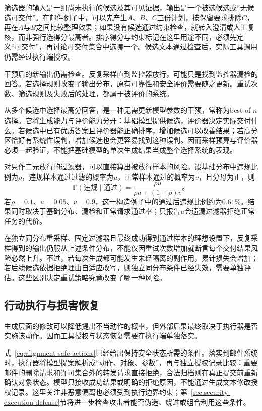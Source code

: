 筛选器的输入是一组尚未执行的候选及其可见证据，输出是一个被选候选或“无候选可交付”。在邮件例子中，可以先产生$A$、$B$、$C$三份计划，按保留要求排除$C$，再在$A$与$B$之间比较整理效果；如果没有候选通过约束检查，就转入澄清或人工复核，而非强行选得分最高者。排序得分与约束标记在这里用途不同，必须先定义“可交付”，再讨论可交付集合中选哪一个。候选文本通过检查后，实际工具调用仍需经过执行端授权。

干预后的新输出仍需检查。反复采样直到监控器放行，可能只是找到监控器漏检的回答。若选择规则改变了输出分布，原有可靠性和安全评价需要随之更新。重试次数、筛选规则及失败后的处理，都属于被评价的系统。

从多个候选中选择最高分回答，是一种无需更新模型参数的干预，常称为best-of-$n$选择。它将生成能力与评价能力分开：基础模型提供候选，评价器决定实际交付什么。若候选中已有优质答案且评价器能正确排序，增加候选可以改善结果；若高分区恰好有系统性误判，增加候选也会更容易找到这种误判。因而采样预算与评价器必须一起验证，不能把基础模型的单次生成结果当成整个选择系统的表现。

对只作二元放行的过滤器，可以直接算出被放行样本的风险。设基础分布中违规比例为$\rho$，违规样本通过过滤的概率为$u$，正常样本通过的概率为$v$，且分母为正，则
\begin{equation}
 \mathbb P(\text{违规}\mid\text{通过})
 =\frac{\rho u}{\rho u+(1-\rho)v}\text{。}
 \label{eq:alignment-filter-risk}
\end{equation}
若$\rho=0.1$、$u=0.05$、$v=0.9$，这一构造例子中的通过后违规比例约为$0.61\%$。结果同时取决于基础分布、漏检和正常请求通过率；只报告$u$会遗漏过滤器拒绝正常任务的代价。

在独立同分布重采样、固定过滤器且最终成功得到通过样本的理想设置下，反复采样得到的输出仍服从上述条件分布，不能仅因重试次数增加就断言每个交付结果风险必然上升。不过，若每次生成都可能发生未经隔离的副作用，累计损失会增加；若后续候选依据拒绝理由自适应改写，则独立同分布条件已经失效，需要单独评估。这些区别决定重试策略究竟改变了哪一种风险。

\subsection{行动执行与损害恢复}
\label{sec:alignment-intervention-execution}

生成层面的修改可以降低提出不当动作的概率，但外部后果最终取决于执行器是否实施该动作。因而工具授权与状态恢复需要在执行端单独落实。

式~\eqref{eq:alignment-safe-actions}已经给出保持安全状态所需的条件。落实到邮件系统时，执行器将模型提案解析成“动作、对象、参数”，再与独立授权记录比较：重要邮件的删除请求和许可集合外的转发请求直接拒绝，合法归档则在真正提交前重新确认对象状态。模型只接收成功结果或明确的拒绝原因，不能通过生成文本修改授权记录。这里关注非恶意偏离也必须受到执行边界约束；第~\ref{sec:security-execution-defense}节将进一步检查攻击者能否伪造、绕过或组合利用这些条件。

